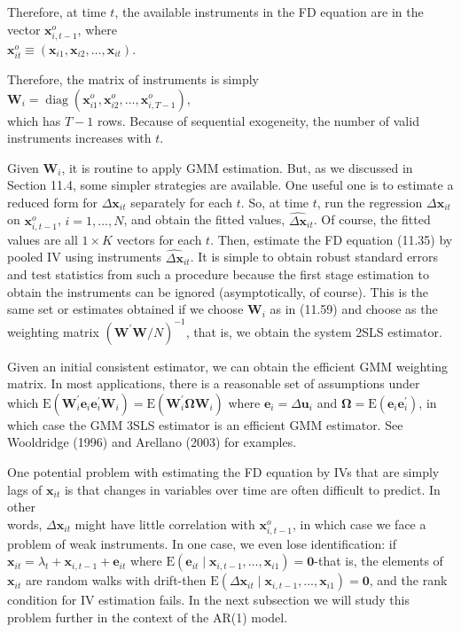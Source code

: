 \documentclass[10pt]{article}
\begin{document}
Therefore, at time $t$, the available instruments in the FD equation are in the vector $\mathbf{x}_{i, t-1}^{o}$, where\\
$\mathbf{x}_{i t}^{o} \equiv\left(\mathbf{x}_{i 1}, \mathbf{x}_{i 2}, \ldots, \mathbf{x}_{i t}\right)$.

Therefore, the matrix of instruments is simply\\
$\mathbf{W}_{i}=\operatorname{diag}\left(\mathbf{x}_{i 1}^{o}, \mathbf{x}_{i 2}^{o}, \ldots, \mathbf{x}_{i, T-1}^{o}\right)$,\\
which has $T-1$ rows. Because of sequential exogeneity, the number of valid instruments increases with $t$.

Given $\mathbf{W}_{i}$, it is routine to apply GMM estimation. But, as we discussed in Section 11.4, some simpler strategies are available. One useful one is to estimate a reduced form for $\Delta \mathbf{x}_{i t}$ separately for each $t$. So, at time $t$, run the regression $\Delta \mathbf{x}_{i t}$ on $\mathbf{x}_{i, t-1}^{o}$, $i=1, \ldots, N$, and obtain the fitted values, $\widehat{\Delta \mathbf{x}}_{i t}$. Of course, the fitted values are all $1 \times K$ vectors for each $t$. Then, estimate the FD equation (11.35) by pooled IV using instruments $\widehat{\Delta \mathbf{x}}_{i t}$. It is simple to obtain robust standard errors and test statistics from such a procedure because the first stage estimation to obtain the instruments can be ignored (asymptotically, of course). This is the same set or estimates obtained if we choose $\mathbf{W}_{i}$ as in (11.59) and choose as the weighting matrix $\left(\mathbf{W}^{\prime} \mathbf{W} / N\right)^{-1}$, that is, we obtain the system 2SLS estimator.

Given an initial consistent estimator, we can obtain the efficient GMM weighting matrix. In most applications, there is a reasonable set of assumptions under which $\mathrm{E}\left(\mathbf{W}_{i}^{\prime} \mathbf{e}_{i} \mathbf{e}_{i}^{\prime} \mathbf{W}_{i}\right)=\mathrm{E}\left(\mathbf{W}_{i}^{\prime} \boldsymbol{\Omega} \mathbf{W}_{i}\right)$ where $\mathbf{e}_{i}=\Delta \mathbf{u}_{i}$ and $\boldsymbol{\Omega}=\mathrm{E}\left(\mathbf{e}_{i} \mathbf{e}_{i}^{\prime}\right)$, in which case the GMM 3SLS estimator is an efficient GMM estimator. See Wooldridge (1996) and Arellano (2003) for examples.

One potential problem with estimating the FD equation by IVs that are simply lags of $\mathbf{x}_{i t}$ is that changes in variables over time are often difficult to predict. In other\\
words, $\Delta \mathbf{x}_{i t}$ might have little correlation with $\mathbf{x}_{i, t-1}^{o}$, in which case we face a problem of weak instruments. In one case, we even lose identification: if $\mathbf{x}_{i t}=\lambda_{t}+\mathbf{x}_{i, t-1}+\mathbf{e}_{i t}$ where $\mathrm{E}\left(\mathbf{e}_{i t} \mid \mathbf{x}_{i, t-1}, \ldots, \mathbf{x}_{i 1}\right)=\mathbf{0}$-that is, the elements of $\mathbf{x}_{i t}$ are random walks with drift-then $\mathrm{E}\left(\Delta \mathbf{x}_{i t} \mid \mathbf{x}_{i, t-1}, \ldots, \mathbf{x}_{i 1}\right)=\mathbf{0}$, and the rank condition for IV estimation fails. In the next subsection we will study this problem further in the context of the AR(1) model.
\end{document}
